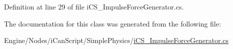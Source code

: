 Definition at line 29 of file i\+C\+S\+\_\+\+Impulse\+Force\+Generator.\+cs.



The documentation for this class was generated from the following file\+:\begin{DoxyCompactItemize}
\item 
Engine/\+Nodes/i\+Can\+Script/\+Simple\+Physics/\hyperlink{i_c_s___impulse_force_generator_8cs}{i\+C\+S\+\_\+\+Impulse\+Force\+Generator.\+cs}\end{DoxyCompactItemize}
